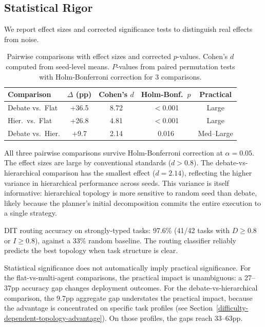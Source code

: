 \subsection{Statistical Rigor}\label{statistical-rigor}

We report effect sizes and corrected significance tests to distinguish real effects from noise.

\begin{table}[t]
\centering
\caption{Pairwise comparisons with effect sizes and corrected $p$-values. Cohen's $d$ computed from seed-level means. $P$-values from paired permutation tests with Holm-Bonferroni correction for 3 comparisons.}
\label{tab:effect_sizes}
\small
\begin{tabular}{lcccc}
\toprule
Comparison & $\Delta$ (pp) & Cohen's $d$ & Holm-Bonf.\ $p$ & Practical \\
\midrule
Debate vs.\ Flat & +36.5 & 8.72 & $<$0.001 & Large \\
Hier.\ vs.\ Flat & +26.8 & 4.81 & $<$0.001 & Large \\
Debate vs.\ Hier. & +9.7 & 2.14 & 0.016 & Med--Large \\
\bottomrule
\end{tabular}
\end{table}

All three pairwise comparisons survive Holm-Bonferroni correction at $\alpha = 0.05$. The effect sizes are large by conventional standards ($d > 0.8$). The debate-vs-hierarchical comparison has the smallest effect ($d = 2.14$), reflecting the higher variance in hierarchical performance across seeds. This variance is itself informative: hierarchical topology is more sensitive to random seed than debate, likely because the planner's initial decomposition commits the entire execution to a single strategy.

DIT routing accuracy on strongly-typed tasks: 97.6\% (41/42 tasks with $D \geq 0.8$ or $I \geq 0.8$), against a 33\% random baseline. The routing classifier reliably predicts the best topology when task structure is clear.

Statistical significance does not automatically imply practical significance. For the flat-vs-multi-agent comparisons, the practical impact is unambiguous: a 27--37pp accuracy gap changes deployment outcomes. For the debate-vs-hierarchical comparison, the 9.7pp aggregate gap understates the practical impact, because the advantage is concentrated on specific task profiles (see Section~\ref{difficulty-dependent-topology-advantage}). On those profiles, the gaps reach 33--63pp.

